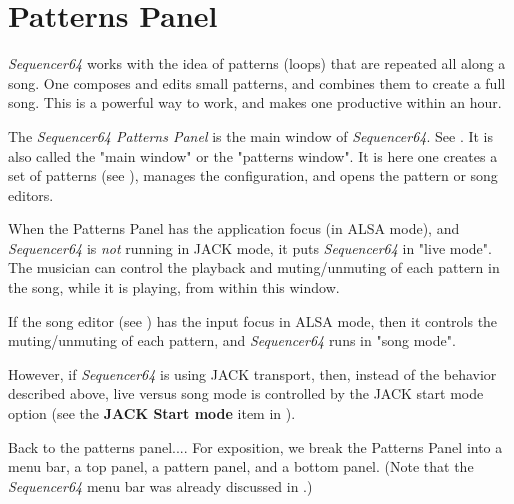 %
%
%

\section{Patterns Panel}
\label{sec:seq64_patterns_panel}

   \textsl{Sequencer64} works with the idea of patterns (loops) that are
   repeated all along a song.  One composes and edits small patterns, and
   combines them to create a full song.  This is a powerful way to work, and
   makes one productive within an hour.

   The \textsl{Sequencer64 Patterns Panel} is the main window of
   \textsl{Sequencer64}.
   See .
   It is also called the "main window" or the "patterns window".
   It is here one creates a set of patterns
   (see ),
   manages the configuration, and opens the pattern or song editors.

   When the Patterns Panel has the application focus (in ALSA mode),
   and \textsl{Sequencer64}
   is \textsl{not} running in JACK mode, it puts
   \textsl{Sequencer64} in "live mode".  The musician can
   control the playback and muting/unmuting of each pattern in
   the song, while it is playing, from within this window.

   If the song editor
   (see )
   has the input focus in ALSA mode, then it controls the muting/unmuting of
   each pattern, and \textsl{Sequencer64} runs in "song mode".

   However, if \textsl{Sequencer64} is using JACK transport, then, instead of
   the behavior described above, live versus song mode is controlled by the
   JACK start mode option (see the \textbf{JACK Start mode} item in
   ).

   Back to the patterns panel....  For exposition, we break the Patterns Panel
   into a menu bar, a top panel, a pattern panel, and a bottom panel.  (Note
   that the \textsl{Sequencer64} menu bar was already discussed in
   .)

